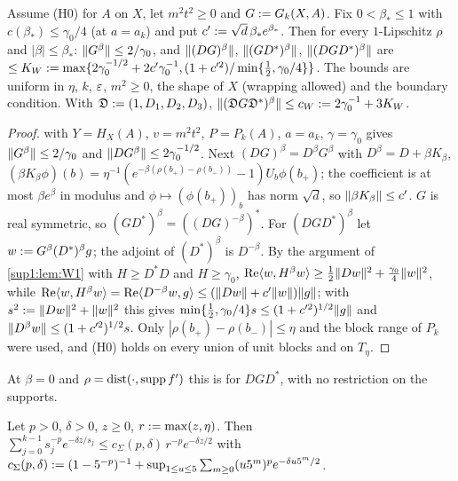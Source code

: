 \begin{lemma}\label{sup1:lem:W2}
Assume (H0) for $A$ on $X$, let $m^2t^2\ge0$ and $G:= G_k(X,A)$. Fix $0<\beta_*\le1$ with $c(\beta_*)\le\gamma_0/4$ (at $a=a_k$) and put $c':=\sqrt d\,\beta_*e^{\beta_*}$. Then for every $1$-Lipschitz $\rho$ and $|\beta|\le\beta_*$: $\lVert G^\beta\rVert\le2/\gamma_0$, and $\lVert (DG)^\beta\rVert$, $\lVert (GD^*)^\beta\rVert$, $\lVert (DGD^*)^\beta\rVert$ are $\le K_W:=\max\{2\gamma_0^{-1/2}+2c'\gamma_0^{-1},(1+c'^2)/\min\{\frac12,\gamma_0/4\}\}$. The bounds are uniform in $\eta$, $k$, $\varepsilon$, $m^2\ge0$, the shape of $X$ (wrapping allowed) and the boundary condition. With $\mathfrak D:=(1,D_1,D_2,D_3)$, $\lVert (\mathfrak DG\mathfrak D^*)^\beta\rVert\le c_W:=2\gamma_0^{-1}+3K_W$.
\end{lemma}

\begin{proof}
 with $Y=H_X(A)$, $v=m^2t^2$, $P=P_k(A)$, $a=a_k$, $\gamma=\gamma_0$ gives $\lVert G^\beta\rVert\le2/\gamma_0$ and $\lVert DG^\beta\rVert\le2\gamma_0^{-1/2}$. Next $(DG)^\beta=D^\beta G^\beta$ with $D^\beta=D+\beta K_\beta$, $(\beta K_\beta\phi)(b)=\eta^{-1}(e^{-\beta(\rho(b_+)-\rho(b_-))}-1)U_b\phi(b_+)$; the coefficient is at most $\beta e^\beta$ in modulus and $\phi\mapsto(\phi(b_+))_b$ has norm $\sqrt d$, so $\lVert \beta K_\beta\rVert\le c'$. $G$ is real symmetric, so $(GD^*)^\beta=((DG)^{-\beta})^*$. For $(DGD^*)^\beta$ let $w:= G^\beta(D^*)^\beta g$; the adjoint of $(D^*)^\beta$ is $D^{-\beta}$. By the argument of \cref{sup1:lem:W1} with $H\ge D^*D$ and $H\ge\gamma_0$, $\operatorname{Re}\langle w,H^\beta w\rangle\ge\frac12\lVert Dw\rVert^2+\frac{\gamma_0}4\lVert w\rVert^2$, while $\operatorname{Re}\langle w,H^\beta w\rangle=\operatorname{Re}\langle D^{-\beta}w,g\rangle\le(\lVert Dw\rVert+c'\lVert w\rVert)\lVert g\rVert$; with $s^2:=\lVert Dw\rVert^2+\lVert w\rVert^2$ this gives $\min\{\frac12,\gamma_0/4\}s\le(1+c'^2)^{1/2}\lVert g\rVert$ and $\lVert D^\beta w\rVert\le(1+c'^2)^{1/2}s$. Only $|\rho(b_+)-\rho(b_-)|\le\eta$ and the block range of $P_k$ were used, and (H0) holds on every union of unit blocks and on $T_\eta$.
\end{proof}

At $\beta=0$ and $\rho=\operatorname{dist}(\cdot,\operatorname{supp} f')$ this is \cite[Cor.~2.3, (2.30)]{Ba4} for $DGD^*$, with no restriction on the supports.

\begin{lemma}[slice sums at $L=5$]\label{sup1:lem:K1}
Let $p>0$, $\delta>0$, $z\ge0$, $r:=\max(z,\eta)$. Then $\sum_{j=0}^{k-1}s_j^{-p}e^{-\delta z/s_j}\le c_\Sigma(p,\delta)\,r^{-p}e^{-\delta z/2}$ with $c_\Sigma(p,\delta):=(1-5^{-p})^{-1}+\sup_{1\le u\le5}\sum_{m\ge0}(u5^m)^pe^{-\delta u5^m/2}$.
\end{lemma}


